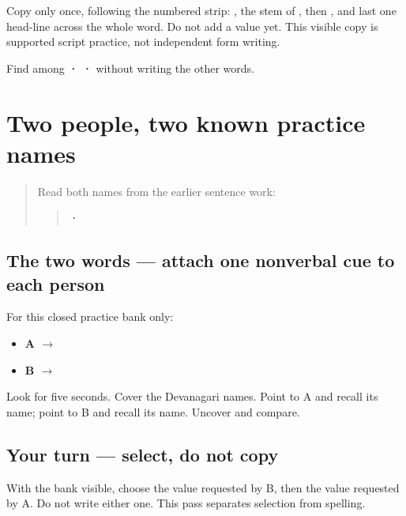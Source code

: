 Copy only \textbf{} once, following the numbered strip: \textbf{}, the stem of \textbf{}, then \textbf{}, and last one head-line across the whole word. Do not add a value yet. This visible copy is supported script practice, not independent form writing.

\begin{tcolorbox}[breakable,colback=teal!4,colframe=teal!35!black,title={Before you move on}]
Find \textbf{} among \textbf{ ·  · } without writing the other words.
\end{tcolorbox}
\section[\texorpdfstring{A \hi{मीरा} · B \hi{अरुण} (A Mīrā; B Aruṇ)}{A मीरा · B अरुण (A Mīrā; B Aruṇ)}]{Two people, two known practice names}

\label{lesson:HI-A1F01-name-select}



\begin{quote}
Read both names from the earlier sentence work:

\begin{quote}
\textbf{ · }
\end{quote}
\end{quote}

\subsection*{The two words — attach one nonverbal cue to each person}
For this closed practice bank only:

\begin{itemize}
\raggedright
  \item \textbf{A $\to$ }
  \item \textbf{B $\to$ }
\end{itemize}

Look for five seconds. Cover the Devanagari names. Point to A and recall its name; point to B and recall its name. Uncover and compare.

\subsection*{Your turn — select, do not copy}
With the bank visible, choose the value requested by B, then the value requested by A. Do not write either one. This pass separates selection from spelling.

